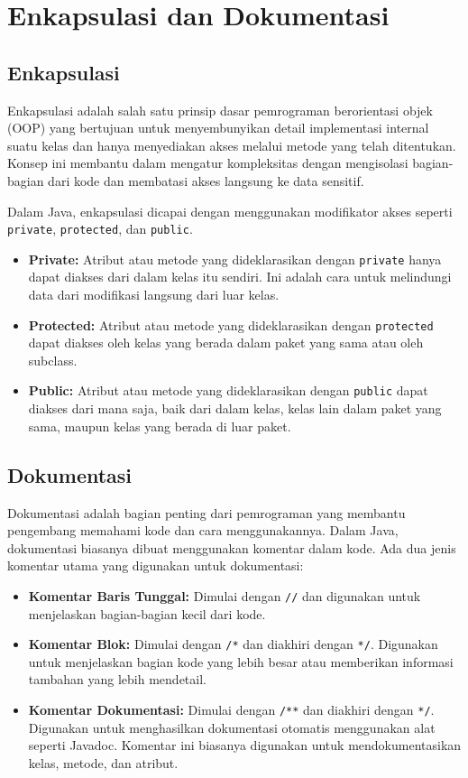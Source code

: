 
\chapter{Enkapsulasi dan Dokumentasi}

\section{Enkapsulasi}

Enkapsulasi adalah salah satu prinsip dasar pemrograman berorientasi objek (OOP) yang bertujuan untuk menyembunyikan detail implementasi internal suatu kelas dan hanya menyediakan akses melalui metode yang telah ditentukan. Konsep ini membantu dalam mengatur kompleksitas dengan mengisolasi bagian-bagian dari kode dan membatasi akses langsung ke data sensitif.

Dalam Java, enkapsulasi dicapai dengan menggunakan modifikator akses seperti \texttt{private}, \texttt{protected}, dan \texttt{public}. 

\begin{itemize}
	\item \textbf{Private:} Atribut atau metode yang dideklarasikan dengan \texttt{private} hanya dapat diakses dari dalam kelas itu sendiri. Ini adalah cara untuk melindungi data dari modifikasi langsung dari luar kelas.
	\item \textbf{Protected:} Atribut atau metode yang dideklarasikan dengan \texttt{protected} dapat diakses oleh kelas yang berada dalam paket yang sama atau oleh subclass.
	\item \textbf{Public:} Atribut atau metode yang dideklarasikan dengan \texttt{public} dapat diakses dari mana saja, baik dari dalam kelas, kelas lain dalam paket yang sama, maupun kelas yang berada di luar paket.
\end{itemize}


\section{Dokumentasi}

Dokumentasi adalah bagian penting dari pemrograman yang membantu pengembang memahami kode dan cara menggunakannya. Dalam Java, dokumentasi biasanya dibuat menggunakan komentar dalam kode. Ada dua jenis komentar utama yang digunakan untuk dokumentasi:

\begin{itemize}
	\item \textbf{Komentar Baris Tunggal:} Dimulai dengan \texttt{//} dan digunakan untuk menjelaskan bagian-bagian kecil dari kode.
	\item \textbf{Komentar Blok:} Dimulai dengan \texttt{/*} dan diakhiri dengan \texttt{*/}. Digunakan untuk menjelaskan bagian kode yang lebih besar atau memberikan informasi tambahan yang lebih mendetail.
	\item \textbf{Komentar Dokumentasi:} Dimulai dengan \texttt{/**} dan diakhiri dengan \texttt{*/}. Digunakan untuk menghasilkan dokumentasi otomatis menggunakan alat seperti Javadoc. Komentar ini biasanya digunakan untuk mendokumentasikan kelas, metode, dan atribut.
\end{itemize}

